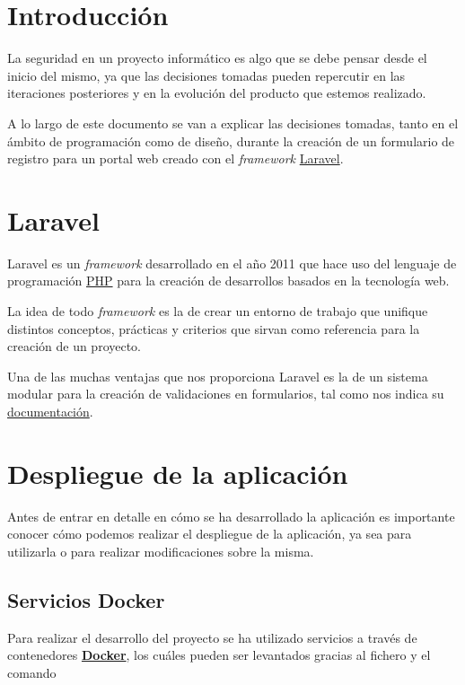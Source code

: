 \documentclass{\ClassPath/viu-tfm-template}
\begin{document}
\graphicspath{{../../VIU_TFM_LaTeX_template/}}

\coverpage

\tableofcontents

\chapter{Introducción}

La seguridad en un proyecto informático es algo que se debe pensar desde el inicio del mismo, ya que las decisiones tomadas pueden repercutir en las iteraciones posteriores y en la evolución del producto que estemos realizado.

A lo largo de este documento se van a explicar las decisiones tomadas, tanto en el ámbito de programación como de diseño, durante la creación de un formulario de registro para un portal web creado con el \textit{framework} \href{https://laravel.com/}{Laravel}.


\chapter{Laravel}

Laravel es un \textit{framework} desarrollado en el año 2011 que hace uso del lenguaje de programación \href{https://www.php.net/}{PHP} para la creación de desarrollos basados en la tecnología web.

La idea de todo \textit{framework} es la de crear un entorno de trabajo que unifique distintos conceptos, prácticas y criterios que sirvan como referencia para la creación de un proyecto.

Una de las muchas ventajas que nos proporciona Laravel es la de un sistema modular para la creación de validaciones en formularios, tal como nos indica su \href{https://laravel.com/docs/6.x/validation}{documentación}.

\chapter{Despliegue de la aplicación}
Antes de entrar en detalle en cómo se ha desarrollado la aplicación es importante conocer cómo podemos realizar el despliegue de la aplicación, ya sea para utilizarla o para realizar modificaciones sobre la misma.

\section{Servicios Docker}
Para realizar el desarrollo del proyecto se ha utilizado servicios a través de contenedores \textbf{\href{https://www.docker.com/}{Docker}}, los cuáles pueden ser levantados gracias al fichero  y el comando 
\end{document}
